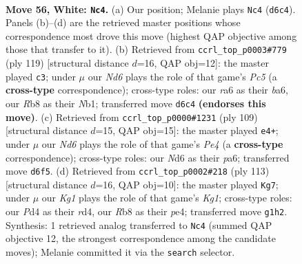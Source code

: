 \documentclass[11pt]{article}
\begin{document}
\clearpage

\begin{figure}[p]\centering
\begin{subfigure}{0.46\textwidth}\centering
\resizebox{\linewidth}{!}{%
\newchessgame
\chessboard[
  setfen={1R6/6p1/r2N1pk1/7p/3P3P/6P1/8/6K1 w - - 5 56},
  showmover=false,
  pgfstyle=straightmove, color=movearrow, markmove={d6-c4}
]}
\caption{}
\end{subfigure}\hfill
\begin{subfigure}{0.46\textwidth}\centering
\resizebox{\linewidth}{!}{%
\newchessgame
\chessboard[
  setfen={8/3k2p1/BP5p/4p3/2p1P1KP/6P1/8/1n6 b - - 3 60},
  showmover=false,
  pgfstyle=straightmove, color=movearrow, markmove={c4-c3}
]}
\caption{}
\end{subfigure}
\\[4pt]
\begin{subfigure}{0.46\textwidth}\centering
\resizebox{\linewidth}{!}{%
\newchessgame
\chessboard[
  setfen={2k5/4R3/P5p1/3pp2p/r7/4PK2/5P2/8 b - - 0 55},
  showmover=false,
  pgfstyle=straightmove, color=movearrow, markmove={e5-e4}
]}
\caption{}
\end{subfigure}\hfill
\begin{subfigure}{0.46\textwidth}\centering
\resizebox{\linewidth}{!}{%
\newchessgame
\chessboard[
  setfen={6k1/5p2/7p/6pP/3RP1P1/5K2/5P2/6r1 b - - 26 57},
  showmover=false,
  pgfstyle=straightmove, color=movearrow, markmove={g8-g7}
]}
\caption{}
\end{subfigure}
\caption{\textbf{Move 56, White: \texttt{Nc4}.} (a) Our position; Melanie plays \texttt{Nc4} (\texttt{d6c4}). Panels (b)--(d) are the retrieved master positions whose correspondence most drove this move (highest QAP objective among those that transfer to it). (b) Retrieved from \texttt{ccrl\_top\_p0003\#779} (ply 119) [structural distance $d$=16, QAP obj=12]: the master played \texttt{c3}; under $\mu$ our \emph{Nd6} plays the role of that game's \emph{Pc5} (a \textbf{cross-type} correspondence); cross-type roles: our \emph{r}a6 as their \emph{b}a6, our \emph{R}b8 as their \emph{N}b1; transferred move \texttt{d6c4} \textbf{(endorses this move)}. (c) Retrieved from \texttt{ccrl\_top\_p0000\#1231} (ply 109) [structural distance $d$=15, QAP obj=15]: the master played \texttt{e4+}; under $\mu$ our \emph{Nd6} plays the role of that game's \emph{Pe4} (a \textbf{cross-type} correspondence); cross-type roles: our \emph{N}d6 as their \emph{p}a6; transferred move \texttt{d6f5}. (d) Retrieved from \texttt{ccrl\_top\_p0002\#218} (ply 113) [structural distance $d$=16, QAP obj=10]: the master played \texttt{Kg7}; under $\mu$ our \emph{Kg1} plays the role of that game's \emph{Kg1}; cross-type roles: our \emph{P}d4 as their \emph{r}d4, our \emph{R}b8 as their \emph{p}e4; transferred move \texttt{g1h2}. Synthesis: 1 retrieved analog transferred to \texttt{Nc4} (summed QAP objective 12, the strongest correspondence among the candidate moves); Melanie committed it via the \texttt{search} selector.}
\label{fig:thought-m110}
\end{figure}
\end{document}
